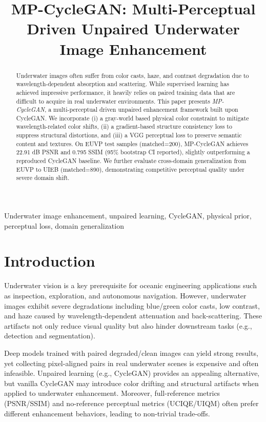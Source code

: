 \documentclass{article}
\title{MP-CycleGAN: Multi-Perceptual Driven Unpaired Underwater Image Enhancement}
\begin{document}
\maketitle

\begin{abstract}
Underwater images often suffer from color casts, haze, and contrast degradation due to wavelength-dependent absorption and scattering.
While supervised learning has achieved impressive performance, it heavily relies on paired training data that are difficult to acquire in real underwater environments.
This paper presents \emph{MP-CycleGAN}, a multi-perceptual driven unpaired enhancement framework built upon CycleGAN.
We incorporate (i) a gray-world based physical color constraint to mitigate wavelength-related color shifts, (ii) a gradient-based structure consistency loss to suppress structural distortions, and (iii) a VGG perceptual loss to preserve semantic content and textures.
On EUVP test samples (matched=200), MP-CycleGAN achieves 22.91 dB PSNR and 0.795 SSIM (95\% bootstrap CI reported), slightly outperforming a reproduced CycleGAN baseline.
We further evaluate cross-domain generalization from EUVP to UIEB (matched=890), demonstrating competitive perceptual quality under severe domain shift.
\end{abstract}

\begin{keywords}
Underwater image enhancement, unpaired learning, CycleGAN, physical prior, perceptual loss, domain generalization
\end{keywords}

\section{Introduction}
Underwater vision is a key prerequisite for oceanic engineering applications such as inspection, exploration, and autonomous navigation.
However, underwater images exhibit severe degradations including blue/green color casts, low contrast, and haze caused by wavelength-dependent attenuation and back-scattering.
These artifacts not only reduce visual quality but also hinder downstream tasks (e.g., detection and segmentation).

Deep models trained with paired degraded/clean images can yield strong results, yet collecting pixel-aligned pairs in real underwater scenes is expensive and often infeasible.
Unpaired learning (e.g., CycleGAN) provides an appealing alternative, but vanilla CycleGAN may introduce color drifting and structural artifacts when applied to underwater enhancement.
Moreover, full-reference metrics (PSNR/SSIM) and no-reference perceptual metrics (UCIQE/UIQM) often prefer different enhancement behaviors, leading to non-trivial trade-offs.
\end{document}
